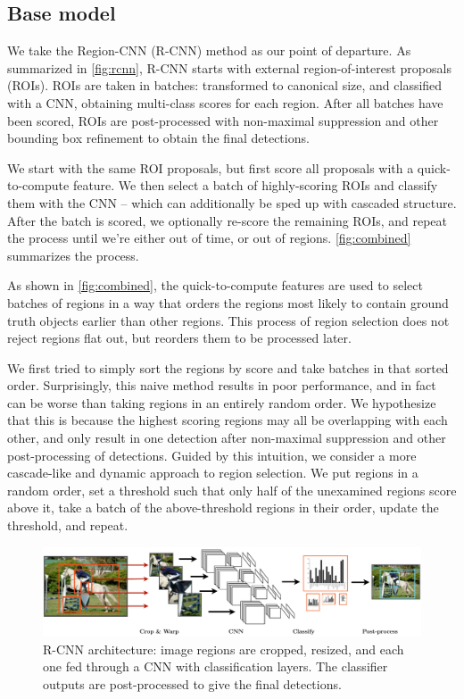 \subsection{Base model}

We take the Region-CNN (R-CNN) \cite{Girshick-CVPR-2014} method as our point of departure.
As summarized in \autoref{fig:rcnn}, R-CNN starts with external region-of-interest proposals (ROIs).
ROIs are taken in batches: transformed to canonical size, and classified with a CNN, obtaining multi-class scores for each region.
After all batches have been scored, ROIs are post-processed with non-maximal suppression and other bounding box refinement to obtain the final detections.

We start with the same ROI proposals, but first score all proposals with a quick-to-compute feature.
We then select a batch of highly-scoring ROIs and classify them with the CNN -- which can additionally be sped up with cascaded structure.
After the batch is scored, we optionally re-score the remaining ROIs, and repeat the process until we're either out of time, or out of regions.
\autoref{fig:combined} summarizes the process.


As shown in \autoref{fig:combined}, the quick-to-compute features are used to select batches of regions in a way that orders the regions most likely to contain ground truth objects earlier than other regions.
This process of region selection does not reject regions flat out, but reorders them to be processed later.

We first tried to simply sort the regions by score and take batches in that sorted order.
Surprisingly, this naive method results in poor performance, and in fact can be worse than taking regions in an entirely random order.
We hypothesize that this is because the highest scoring regions may all be overlapping with each other, and only result in one detection after non-maximal suppression and other post-processing of detections.
Guided by this intuition, we consider a more cascade-like and dynamic approach to region selection.
We put regions in a random order, set a threshold such that only half of the unexamined regions score above it, take a batch of the above-threshold regions in their order, update the threshold, and repeat.

\begin{figure}[h!]
\begin{center}
\includegraphics[width=0.98\columnwidth]{figures/rcnn.pdf}
\caption{
R-CNN architecture: image regions are cropped, resized, and each one fed through a CNN with classification layers.
The classifier outputs are post-processed to give the final detections.
}\label{fig:rcnn}
\end{center}
\end{figure}

